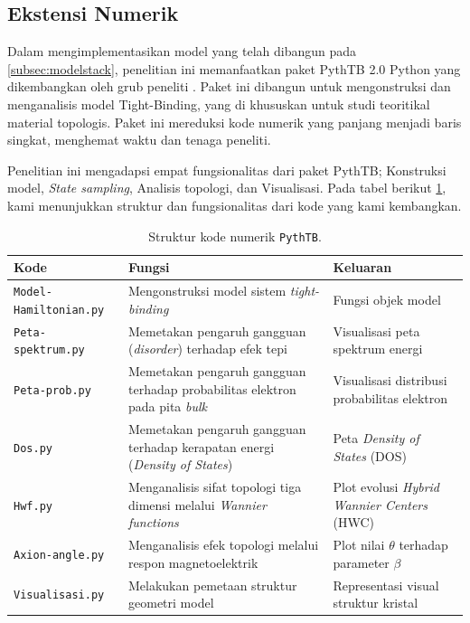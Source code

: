 \subsection{Ekstensi Numerik}
Dalam mengimplementasikan model yang telah dibangun pada \ref{subsec:modelstack}, penelitian ini memanfaatkan paket PythTB 2.0 Python yang dikembangkan oleh grub peneliti \parencite{Cole_Python_Tight_Binding_2025}. Paket ini dibangun untuk mengonstruksi dan menganalisis model Tight-Binding, yang di khususkan untuk studi teoritikal material topologis. Paket ini mereduksi kode numerik yang panjang menjadi baris singkat, menghemat waktu dan tenaga peneliti.
\par
Penelitian ini mengadapsi empat fungsionalitas dari paket PythTB; Konstruksi model, \textit{State sampling}, Analisis topologi, dan Visualisasi. Pada tabel berikut \ref{tab:kodex}, kami menunjukkan struktur dan fungsionalitas dari kode yang kami kembangkan.
\begin{table}[htbp]
\centering
\caption{Struktur kode numerik \texttt{PythTB}.}
\label{tab:kodex}
\begin{tabularx}{\textwidth}{@{}l X X @{}} 
\toprule
\textbf{Kode} & \textbf{Fungsi} & \textbf{Keluaran} \\ \midrule
\texttt{Model-Hamiltonian.py} & Mengonstruksi model sistem \textit{tight-binding} & Fungsi objek model \\ \addlinespace
\texttt{Peta-spektrum.py} & Memetakan pengaruh gangguan (\textit{disorder}) terhadap efek tepi & Visualisasi peta spektrum energi \\ \addlinespace
\texttt{Peta-prob.py} & Memetakan pengaruh gangguan terhadap probabilitas elektron pada pita \textit{bulk} & Visualisasi distribusi probabilitas elektron \\ \addlinespace
\texttt{Dos.py} & Memetakan pengaruh gangguan terhadap kerapatan energi (\textit{Density of States}) & Peta \textit{Density of States} (DOS) \\ \addlinespace
\texttt{Hwf.py} & Menganalisis sifat topologi tiga dimensi melalui \textit{Wannier functions} & Plot evolusi \textit{Hybrid Wannier Centers} (HWC) \\ \addlinespace
\texttt{Axion-angle.py} & Menganalisis efek topologi melalui respon magnetoelektrik & Plot nilai $\theta$ terhadap parameter $\beta$ \\ \addlinespace
\texttt{Visualisasi.py} & Melakukan pemetaan struktur geometri model & Representasi visual struktur kristal \\ \bottomrule
\end{tabularx}
\end{table}

